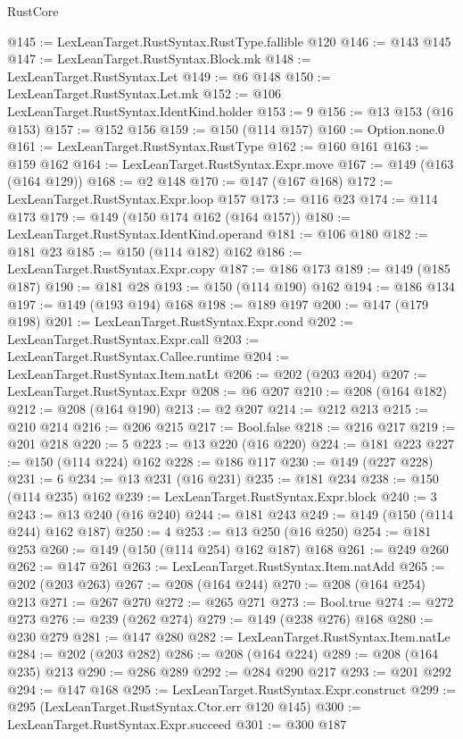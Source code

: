 \begin{lexlean}{RustCore}
\begin{coremodule}
{\begin{coremodule}
{{{{{@145 := LexLeanTarget.RustSyntax.RustType.fallible @120
@146 := @143 @145
@147 := LexLeanTarget.RustSyntax.Block.mk
@148 := LexLeanTarget.RustSyntax.Let
@149 := @6 @148
@150 := LexLeanTarget.RustSyntax.Let.mk
@152 := @106 LexLeanTarget.RustSyntax.IdentKind.holder
@153 := 9
@156 := @13 @153 (@16 @153)
@157 := @152 @156
@159 := @150 (@114 @157)
@160 := Option.none.{0}
@161 := LexLeanTarget.RustSyntax.RustType
@162 := @160 @161
@163 := @159 @162
@164 := LexLeanTarget.RustSyntax.Expr.move
@167 := @149 (@163 (@164 @129))
@168 := @2 @148
@170 := @147 (@167 @168)
@172 := LexLeanTarget.RustSyntax.Expr.loop @157
@173 := @116 @23
@174 := @114 @173
@179 := @149 (@150 @174 @162 (@164 @157))
@180 := LexLeanTarget.RustSyntax.IdentKind.operand
@181 := @106 @180
@182 := @181 @23
@185 := @150 (@114 @182) @162
@186 := LexLeanTarget.RustSyntax.Expr.copy
@187 := @186 @173
@189 := @149 (@185 @187)
@190 := @181 @28
@193 := @150 (@114 @190) @162
@194 := @186 @134
@197 := @149 (@193 @194) @168
@198 := @189 @197
@200 := @147 (@179 @198)
@201 := LexLeanTarget.RustSyntax.Expr.cond
@202 := LexLeanTarget.RustSyntax.Expr.call
@203 := LexLeanTarget.RustSyntax.Callee.runtime
@204 := LexLeanTarget.RustSyntax.Item.natLt
@206 := @202 (@203 @204)
@207 := LexLeanTarget.RustSyntax.Expr
@208 := @6 @207
@210 := @208 (@164 @182)
@212 := @208 (@164 @190)
@213 := @2 @207
@214 := @212 @213
@215 := @210 @214
@216 := @206 @215
@217 := Bool.false
@218 := @216 @217
@219 := @201 @218
@220 := 5
@223 := @13 @220 (@16 @220)
@224 := @181 @223
@227 := @150 (@114 @224) @162
@228 := @186 @117
@230 := @149 (@227 @228)
@231 := 6
@234 := @13 @231 (@16 @231)
@235 := @181 @234
@238 := @150 (@114 @235) @162
@239 := LexLeanTarget.RustSyntax.Expr.block
@240 := 3
@243 := @13 @240 (@16 @240)
@244 := @181 @243
@249 := @149 (@150 (@114 @244) @162 @187)
@250 := 4
@253 := @13 @250 (@16 @250)
@254 := @181 @253
@260 := @149 (@150 (@114 @254) @162 @187) @168
@261 := @249 @260
@262 := @147 @261
@263 := LexLeanTarget.RustSyntax.Item.natAdd
@265 := @202 (@203 @263)
@267 := @208 (@164 @244)
@270 := @208 (@164 @254) @213
@271 := @267 @270
@272 := @265 @271
@273 := Bool.true
@274 := @272 @273
@276 := @239 (@262 @274)
@279 := @149 (@238 @276) @168
@280 := @230 @279
@281 := @147 @280
@282 := LexLeanTarget.RustSyntax.Item.natLe
@284 := @202 (@203 @282)
@286 := @208 (@164 @224)
@289 := @208 (@164 @235) @213
@290 := @286 @289
@292 := @284 @290 @217
@293 := @201 @292
@294 := @147 @168
@295 := LexLeanTarget.RustSyntax.Expr.construct
@299 := @295 (LexLeanTarget.RustSyntax.Ctor.err @120 @145)
@300 := LexLeanTarget.RustSyntax.Expr.succeed
@301 := @300 @187
}}}}}
\end{coremodule}}
\end{coremodule}
\end{lexlean}
